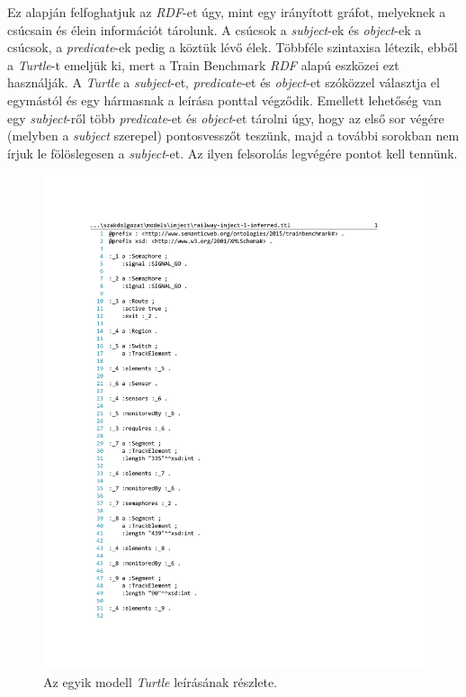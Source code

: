 Ez alapján felfoghatjuk az \emph{RDF}-et úgy, mint egy irányított gráfot, melyeknek a csúcsain és élein információt tárolunk. A csúcsok a \emph{subject}-ek és \emph{object}-ek a csúcsok, a \emph{predicate}-ek pedig a köztük lévő élek. Többféle szintaxisa létezik, ebből a \emph{Turtle}-t emeljük ki, mert a Train Benchmark \emph{RDF} alapú eszközei ezt használják. A \emph{Turtle} a \emph{subject}-et, \emph{predicate}-et és \emph{object}-et szóközzel választja el egymástól és egy hármasnak a leírása ponttal végződik. Emellett lehetőség van egy \emph{subject}-ről több \emph{predicate}-et és \emph{object}-et tárolni úgy, hogy az első sor végére (melyben a \emph{subject} szerepel) pontosvesszőt teszünk, majd a további sorokban nem írjuk le fölöslegesen a \emph{subject}-et. Az ilyen felsorolás legvégére pontot kell tennünk.
\begin{figure}[H]
	\centering
	\includegraphics{figures/Turtle.pdf}
	\caption{Az egyik modell \emph{Turtle} leírásának részlete.}
	\label{fig:Turtle}
\end{figure}

